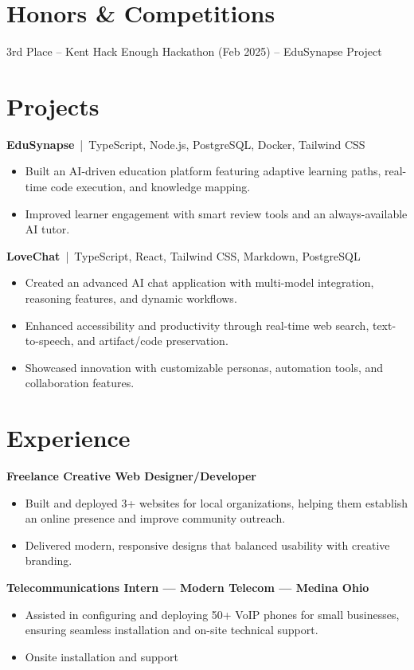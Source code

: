 \documentclass[10pt]{article}
\begin{document}
\section*{Honors \& Competitions}
3rd Place – Kent Hack Enough Hackathon (Feb 2025) – EduSynapse Project

\section*{Projects}

\textbf{EduSynapse} \,|\, TypeScript, Node.js, PostgreSQL, Docker, Tailwind CSS
\begin{itemize}
  \item Built an AI-driven education platform featuring adaptive learning paths, real-time code execution, and knowledge mapping.
  \item Improved learner engagement with smart review tools and an always-available AI tutor.
\end{itemize}

\textbf{LoveChat} \,|\, TypeScript, React, Tailwind CSS, Markdown, PostgreSQL
\begin{itemize}
  \item Created an advanced AI chat application with multi-model integration, reasoning features, and dynamic workflows.
  \item Enhanced accessibility and productivity through real-time web search, text-to-speech, and artifact/code preservation.
  \item Showcased innovation with customizable personas, automation tools, and collaboration features.
\end{itemize}

\section*{Experience}
\textbf{Freelance Creative Web Designer/Developer}
\begin{itemize}
  \item Built and deployed 3+ websites for local organizations, helping them establish an online presence and improve community outreach.
  \item Delivered modern, responsive designs that balanced usability with creative branding.
\end{itemize}

\textbf{Telecommunications Intern — Modern Telecom — Medina Ohio}
\begin{itemize}
  \item Assisted in configuring and deploying 50+ VoIP phones for small businesses, ensuring seamless installation and on-site technical support.
  \item Onsite installation and support
\end{itemize}
\end{document}
